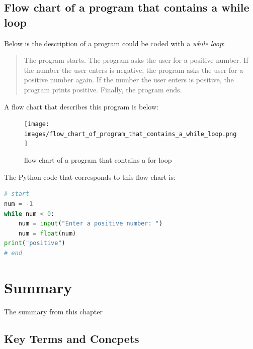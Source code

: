 \documentclass{book}
\begin{document}
    
        \subsection{Flow chart of a program that contains a while
loop}\label{flow-chart-of-a-program-that-contains-a-while-loop}
    




    
        Below is the description of a program could be coded with a \emph{while
loop}:

\begin{quote}
The program starts. The program asks the user for a positive number. If
the number the user enters is negative, the program asks the user for a
positive number again. If the number the user enters is positive, the
program prints positive. Finally, the program ends.
\end{quote}

A flow chart that describes this program is below:

\begin{figure}
\centering
\texttt{[image: images/flow\_chart\_of\_program\_that\_contains\_a\_while\_loop.png]}
\caption{flow chart of a program that contains a for loop}
\end{figure}

The Python code that corresponds to this flow chart is:

\begin{lstlisting}[language=Python]
# start
num = -1
while num < 0:
    num = input("Enter a positive number: ")
    num = float(num)
print("positive")
# end
\end{lstlisting}
    




    
        \newpage
        \section{Summary}\label{summary}

    




    
        The summary from this chapter
    




    
        \subsection{Key Terms and Concpets}\label{key-terms-and-concpets}
    
\end{document}
